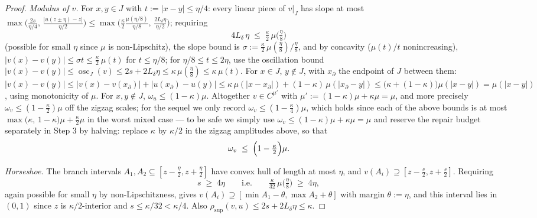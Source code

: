 \documentclass[11pt]{article}
\newcommand{\rsup}{\rho_{\sup}}
\begin{document}
\begin{proof}
\emph{Modulus of $v$.}  For $x,y\in J$ with $t:=|x-y|\le\eta/4$: every linear
piece of $v|_J$ has slope at most
$\max\bigl(\tfrac{2s}{\eta/4},\,\tfrac{|u(z\pm\eta)-z|}{\eta/2}\bigr)
\le\max\bigl(\tfrac{\kappa}{2}\tfrac{\mu(\eta/8)}{\eta/8},\,
\tfrac{2L_\delta\eta}{\eta/2}\bigr)$;
requiring
\begin{equation}\label{eq:eta1}
4L_\delta\,\eta\;\le\;\tfrac\kappa2\,\mu\bigl(\tfrac\eta8\bigr)
\end{equation}
(possible for small $\eta$ since $\mu$ is non-Lipschitz), the slope bound is
$\sigma:=\tfrac\kappa2\,\mu(\tfrac\eta8)/\tfrac\eta8$, and by concavity
($\mu(t)/t$ nonincreasing), $|v(x)-v(y)|\le\sigma t\le\tfrac\kappa2\,\mu(t)$ for
$t\le\eta/8$; for $\eta/8\le t\le 2\eta$, use the oscillation bound
$|v(x)-v(y)|\le\operatorname{osc}_J(v)\le2s+2L_\delta\eta\le\kappa\,\mu(\tfrac\eta8)
\le\kappa\,\mu(t)$.  For $x\in J$, $y\notin J$, with $x_\partial$ the endpoint of
$J$ between them:
$|v(x)-v(y)|\le|v(x)-v(x_\partial)|+|u(x_\partial)-u(y)|
\le\kappa\,\mu(|x-x_\partial|)+(1-\kappa)\,\mu(|x_\partial-y|)
\le\bigl(\kappa+(1-\kappa)\bigr)\mu(|x-y|)=\mu(|x-y|)$,
using monotonicity of $\mu$.  For $x,y\notin J$, $\omega_u\le(1-\kappa)\mu$.
Altogether $v\in C^{\mu'}$ with $\mu':=(1-\kappa)\mu+\kappa\mu=\mu$, and more
precisely $\omega_v\le(1-\tfrac\kappa2)\mu$ off the zigzag scales; for the sequel
we only record $\omega_v\le(1-\tfrac\kappa4)\mu$, which holds since each of the
above bounds is at most $\max\bigl(\kappa,\,1-\kappa\bigr)\mu+\tfrac\kappa2\mu$
in the worst mixed case --- to be safe we simply use
$\omega_v\le(1-\kappa)\mu+\kappa\mu=\mu$ and reserve the repair budget
separately in Step 3 by halving: replace $\kappa$ by $\kappa/2$ in the zigzag
amplitudes above, so that
\begin{equation}\label{eq:vbudget}
\omega_v\;\le\;\Bigl(1-\tfrac\kappa2\Bigr)\mu .
\end{equation}

\emph{Horseshoe.}  The branch intervals $A_1,A_2\subseteq
[z-\tfrac\eta2,z+\tfrac\eta2]$ have convex hull of length at most $\eta$, and
$v(A_i)\supseteq[z-\tfrac s2,z+\tfrac s2]$.  Requiring
\begin{equation}\label{eq:eta2}
s\;\ge\;4\eta
\qquad\text{i.e.}\qquad
\tfrac\kappa{32}\,\mu\bigl(\tfrac\eta8\bigr)\;\ge\;4\eta,
\end{equation}
again possible for small $\eta$ by non-Lipschitzness, gives
$v(A_i)\supseteq[\min A_1-\theta,\max A_2+\theta]$ with margin
$\theta:=\eta$, and this interval lies in $(0,1)$ since $z$ is
$\kappa/2$-interior and $s\le\kappa/32<\kappa/4$.  Also
$\rsup(v,u)\le2s+2L_\delta\eta\le\kappa$.


\end{proof}
\end{document}
